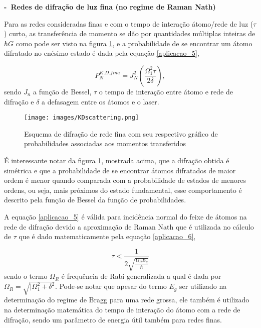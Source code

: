 		\textbf{-\ Redes de difração de luz fina (no regime de Raman Nath)}

			\par Para as redes consideradas finas e com o tempo de interação átomo/rede de luz ($\tau$) curto, as transferência de momento se dão por quantidades múltiplas inteiras de $\hbar G$ como pode ser visto na figura \ref{KDscattering_ricardo}, e a probabilidade de se encontrar um átomo difratado no enésimo estado é dada pela equação \eqref{aplicacao_5},

			\begin{equation}
				\label{aplicacao_5}
				P_{N}^{K.D.fina} = J_{N}^2 \left(\frac{\Omega_{1}^2 \tau}{2\delta}\right),
			\end{equation}
			sendo $J_{n}$ a função de Bessel, $\tau$ o tempo de interação entre átomo e rede de difração e $\delta$ a defasagem entre os átomos e o laser\cite{ricardo_5}.

			\begin{figure}[h!]
		      \caption{Esquema de difração de rede fina com seu respectivo gráfico de probabilidades associadas aos momentos transferidos}
		      \centering
		      \texttt{[image: images/KDscattering.png]}
		      \label{KDscattering_ricardo}
	    	\end{figure}

	    	\par É interessante notar da figura \ref{KDscattering_ricardo}, mostrada acima, que a difração obtida é simétrica e que a probabilidade de se encontrar átomos difratados de maior ordem é menor quando comparada com a probabilidade de  estados de menores ordens, ou seja, mais próximos do estado fundamental, esse comportamento é descrito pela função de Bessel da função de probabilidades\cite{ricardo_6}. 
			
			\par A equação \eqref{aplicacao_5} é válida para incidência normal do feixe de átomos na rede de difração devido a aproximação de Raman Nath que é utilizada no cálculo de $\tau$ que é dado matematicamente pela equação \eqref{aplicacao_6},

			\begin{equation}
				\label{aplicacao_6}
				\tau < \frac{1}{2 \sqrt{\frac{\Omega_{R} E_{g}}{\hbar}}}
			\end{equation}
			sendo o termo $\Omega_{R}$ é frequência de Rabi generalizada a qual é dada por $\Omega_{R} = \sqrt{|\Omega_{1}^2 + \delta^2}$\cite{ricardo_5}. Pode-se notar que apesar do termo $E_{g}$ ser utilizado na determinação do regime de Bragg para uma rede grossa, ele também é utilizado na determinação matemática do tempo de interação do átomo com a rede de difração, sendo um parâmetro de energia útil também para redes finas.
		
